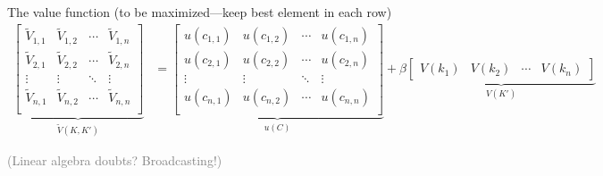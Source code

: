 \documentclass[10pt, aspectratio=1610, handout]{beamer}
\newcommand{\backbutton}[1]{\hyperlink{#1}{\beamerreturnbutton{Back}}}
\begin{document}
\begin{frame}
    The value function (to be maximized---keep best element in each row)
    \begin{align*}
      \underbrace{\begin{bmatrix}
        \tilde{V}_{1,1} & \tilde{V}_{1,2} & \cdots & \tilde{V}_{1,n} \\
        \tilde{V}_{2,1} & \tilde{V}_{2,2} & \cdots & \tilde{V}_{2,n} \\
        \vdots   & \vdots   & \ddots & \vdots   \\
        \tilde{V}_{n,1} & \tilde{V}_{n,2} & \cdots & \tilde{V}_{n,n} \\
      \end{bmatrix}}_{\tilde{V}(K, K')}
      &=
      \underbrace{\begin{bmatrix}
        u(c_{1,1}) & u(c_{1,2}) & \cdots & u(c_{1,n}) \\
        u(c_{2,1}) & u(c_{2,2}) & \cdots & u(c_{2,n}) \\
        \vdots  & \vdots  & \ddots & \vdots  \\
        u(c_{n,1}) & u(c_{n,2}) & \cdots & u(c_{n,n}) \\
      \end{bmatrix}}_{u(C)}
      + \beta
      \underbrace{\begin{bmatrix}
        V(k_1) & V(k_2) & \cdots & V(k_n)
      \end{bmatrix}}_{V(K')}
    \end{align*}

    \vfill

    \vfill

    \textcolor{gray}{(Linear algebra doubts? Broadcasting!)}
    \hfill
    \backbutton{sld:vfi_algo}

  \end{frame}
\end{document}

